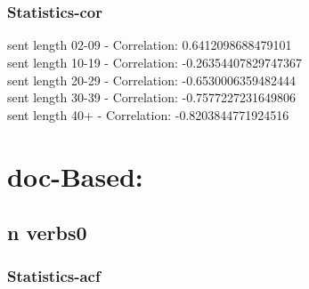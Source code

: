 \documentclass{article}%
\begin{document}
\begin{figure}[ht]%
\centering%
\setlength{\abovecaptionskip}{-35pt}%
%
%
\\%
%
%
\\%
%
\end{figure}

%
\newpage%
\subsubsection{Statistics{-}cor}%
\label{ssubsec:Statistics{-}cor}%
\noindent%
sent length 02-09 - Correlation: 0.6412098688479101\\%
sent length 10-19 - Correlation: -0.26354407829747367\\%
sent length 20-29 - Correlation: -0.6530006359482444\\%
sent length 30-39 - Correlation: -0.7577227231649806\\%
sent length 40+ - Correlation: -0.8203844771924516\\

%
\newpage

%
\section{doc{-}Based:}%
\label{sec:doc{-}Based}%
\subsection{n verbs0}%
\label{subsec:nverbs0}%
\subsubsection{Statistics{-}acf}%
\label{ssubsec:Statistics{-}acf}%
\end{document}
